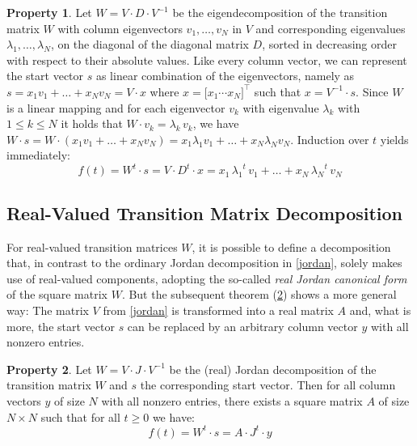 \documentclass{sn-jnl}
\theoremstyle{definition}
\newtheorem{prop}{Property}
\begin{document}
\begin{prop}\label{eigen}
Let $W = V \cdot D \cdot V^{-1}$ be the eigendecomposition of the transition matrix $W$ with column
eigenvectors $v_1,\dots,v_N$ in $V$ and corresponding eigenvalues $\lambda_1, \dots, \lambda_N$,
on the diagonal of the diagonal matrix $D$, sorted in decreasing order with
respect to their absolute values. Like every column vector, we can represent the
start vector $s$ as linear combination of the eigenvectors, namely as $s =
x_1 v_1 + \dots + x_N v_N = V \cdot x$ where $x = \big[ x_1 \cdots x_N
\big]^\top$ such that $x = V^{-1} \cdot s$.
Since $W$ is a linear mapping and for each eigenvector $v_k$ with eigenvalue
$\lambda_k$ with $1 \le k \le N$ it holds that $W \cdot v_k = \lambda_k\, v_k$, we
have $W \cdot s = W \cdot (x_1 v_1 + \dots + x_N v_N) = x_1 \lambda_1 v_1 +
\dots + x_N \lambda_N v_N$. Induction over $t$ yields immediately:
\begin{equation}\label{form}
	f(t) = W^t \cdot s = V \cdot D^t \cdot x =
	x_1\,{\lambda_1}^t\,v_1 + \dots + x_N\,{\lambda_N}^t\,v_N
\end{equation}
\end{prop}

\subsection{Real-Valued Transition Matrix Decomposition}\label{real}

For real-valued transition matrices $W$, it is possible to define a
decomposition that, in contrast to the ordinary Jordan decomposition in
\cref{jordan}, solely makes use of real-valued components, adopting the
so-called \emph{real Jordan canonical form} \citep[Section~3.4.1]{HJ13} of the
square matrix $W$. But the
subsequent theorem (\cref{chad}) shows a more general way: The matrix $V$ from
\cref{jordan} is transformed into a real matrix $A$ and, what is more, the start
vector $s$ can be replaced by an arbitrary column vector $y$ with all nonzero
entries.

\begin{prop}\label{chad}
Let $W = V \cdot J \cdot V^{-1}$ be the (real) Jordan decomposition of the
transition matrix $W$ and $s$ the corresponding start vector. Then for all
column vectors $y$ of size $N$ with all nonzero entries, there exists a square
matrix $A$ of size $N \times N$ such that for all $t \ge 0$ we have:
\[ f(t) = W^t \cdot s = A \cdot J^t \cdot y \]
\end{prop}
\end{document}
